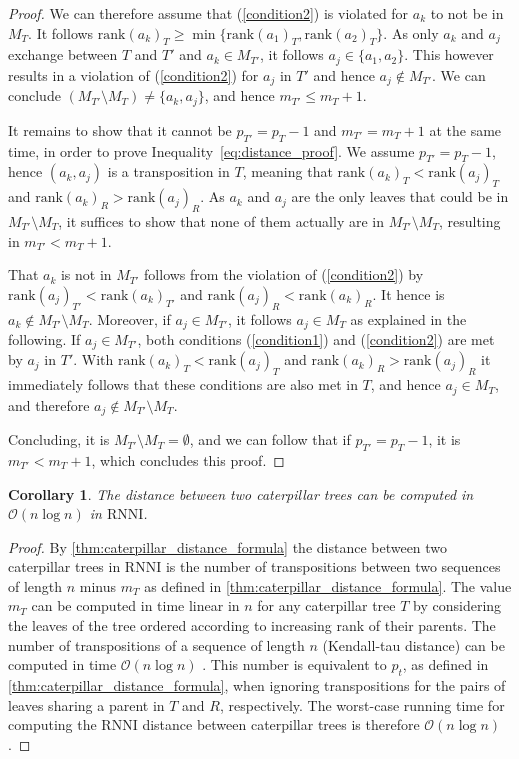 \documentclass[11pt]{amsart}
\newtheorem{corollary}{Corollary}
\newcommand{\rnni}{\mathrm{RNNI}}
\newcommand{\rank}{\mathrm{rank}}
\renewcommand{\O}{\mathcal O}
\begin{document}
\begin{proof}
	We can therefore assume that (\ref{condition2}) is violated for $a_k$ to not be in $M_T$.
	It follows $\rank(a_k)_T \geq \min\{\rank(a_1)_T, \rank(a_2)_T\}$.
	As only $a_k$ and $a_j$ exchange between $T$ and $T'$ and $a_k \in M_{T'}$, it follows $a_j \in \{a_1, a_2\}$.
	This however results in a violation of (\ref{condition2}) for $a_j$ in $T'$ and hence $a_j \notin M_{T'}$.
	We can conclude $(M_{T'} \setminus M_T) \neq \{a_k, a_j\}$, and hence $m_{T'} \leq m_T + 1$.

	It remains to show that it cannot be $p_{T'} = p_T - 1$ and $m_{T'} = m_T + 1$ at the same time, in order to prove Inequality~\ref{eq:distance_proof}.
	We assume $p_{T'} = p_T - 1$, hence $(a_k,a_j)$ is a transposition in $T$, meaning that $\rank(a_k)_T < \rank(a_j)_T$ and $\rank(a_k)_R > \rank(a_j)_R$.
	As $a_k$ and $a_j$ are the only leaves that could be in $M_{T'} \setminus M_T$, it suffices to show that none of them actually are in $M_{T'} \setminus M_T$, resulting in $m_{T'} < m_T + 1$.

	That $a_k$ is not in $M_{T'}$ follows from the violation of (\ref{condition2}) by $\rank(a_j)_{T'} < \rank(a_k)_{T'}$ and $\rank(a_j)_R < \rank(a_k)_R$.
	It hence is $a_k \notin M_{T'} \setminus M_T$.
	Moreover, if $a_j \in M_{T'}$, it follows $a_j \in M_T$ as explained in the following.
	If $a_j \in M_{T'}$, both conditions (\ref{condition1}) and (\ref{condition2}) are met by $a_j$ in $T'$.
	With $\rank(a_k)_T < \rank(a_j)_T$ and $\rank(a_k)_R > \rank(a_j)_R$ it immediately follows that these conditions are also met in $T$, and hence $a_j \in M_T$, and therefore $a_j \notin M_{T'} \setminus M_T$.

	Concluding, it is $M_{T'} \setminus M_T = \emptyset$, and we can follow that if $p_{T'} = p_T - 1$, it is $m_{T'} < m_T + 1$, which concludes this proof.
\end{proof}

\begin{corollary}
	The distance between two caterpillar trees can be computed in $\O(n \log n)$ in $\rnni$.
	\label{cor:caterpillar_distance_rnni_nlogn}
\end{corollary}

\begin{proof}
	By \autoref{thm:caterpillar_distance_formula} the distance between two caterpillar trees in $\rnni$ is the number of transpositions between two sequences of length $n$ minus $m_T$ as defined in \autoref{thm:caterpillar_distance_formula}.
	The value $m_T$ can be computed in time linear in $n$ for any caterpillar tree $T$ by considering the leaves of the tree ordered according to increasing rank of their parents.
	The number of transpositions of a sequence of length $n$ (Kendall-tau distance) can be computed in time $\O(n \log n)$ \autocite{Knight1966-hx}.
	This number is equivalent to $p_t$, as defined in \autoref{thm:caterpillar_distance_formula}, when ignoring transpositions for the pairs of leaves sharing a parent in $T$ and $R$, respectively.
	The worst-case running time for computing the $\rnni$ distance between caterpillar trees is therefore $\O(n \log n)$.
\end{proof}
\end{document}
